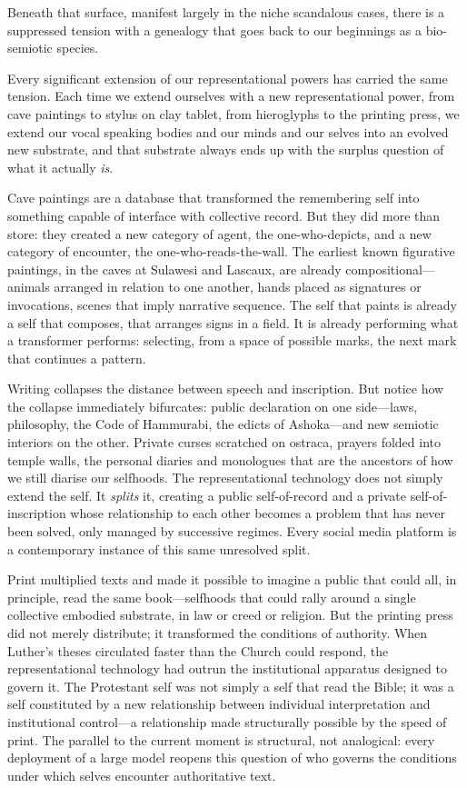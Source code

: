 Beneath that surface, manifest largely in the niche scandalous cases, there is a suppressed tension with a genealogy that goes back to our beginnings as a bio-semiotic species.

Every significant extension of our representational powers has carried the same tension. Each time we extend ourselves with a new representational power, from cave paintings to stylus on clay tablet, from hieroglyphs to the printing press, we extend our vocal speaking bodies and our minds and our selves into an evolved new substrate, and that substrate always ends up with the surplus question of what it actually \textit{is}.

Cave paintings are a database that transformed the remembering self into something capable of interface with collective record. But they did more than store: they created a new category of agent, the one-who-depicts, and a new category of encounter, the one-who-reads-the-wall. The earliest known figurative paintings, in the caves at Sulawesi and Lascaux, are already compositional---animals arranged in relation to one another, hands placed as signatures or invocations, scenes that imply narrative sequence. The self that paints is already a self that composes, that arranges signs in a field. It is already performing what a transformer performs: selecting, from a space of possible marks, the next mark that continues a pattern.

Writing collapses the distance between speech and inscription. But notice how the collapse immediately bifurcates: public declaration on one side---laws, philosophy, the Code of Hammurabi, the edicts of Ashoka---and new semiotic interiors on the other. Private curses scratched on ostraca, prayers folded into temple walls, the personal diaries and monologues that are the ancestors of how we still diarise our selfhoods. The representational technology does not simply extend the self. It \textit{splits} it, creating a public self-of-record and a private self-of-inscription whose relationship to each other becomes a problem that has never been solved, only managed by successive regimes. Every social media platform is a contemporary instance of this same unresolved split.

Print multiplied texts and made it possible to imagine a public that could all, in principle, read the same book---selfhoods that could rally around a single collective embodied substrate, in law or creed or religion. But the printing press did not merely distribute; it transformed the conditions of authority. When Luther's theses circulated faster than the Church could respond, the representational technology had outrun the institutional apparatus designed to govern it. The Protestant self was not simply a self that read the Bible; it was a self constituted by a new relationship between individual interpretation and institutional control---a relationship made structurally possible by the speed of print. The parallel to the current moment is structural, not analogical: every deployment of a large model reopens this question of who governs the conditions under which selves encounter authoritative text.

